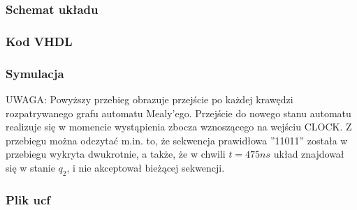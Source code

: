\documentclass[a4paper,12pt]{extarticle}  %
\begin{document}
    \subsubsection{Schemat układu}
    \begin{figure}[H]
        \centering
    \end{figure}
    \newpage
    \subsubsection{Kod VHDL}
    
    \subsubsection{Symulacja}
    \begin{figure}[H]
        \centering
    \end{figure}
    UWAGA: Powyższy przebieg obrazuje przejście po każdej krawędzi rozpatrywanego grafu automatu Mealy'ego. Przejście do nowego stanu automatu realizuje się w momencie wystąpienia zbocza wznoszącego na wejściu CLOCK. Z przebiegu można odczytać m.in. to, że sekwencja prawidłowa ''11011'' została w przebiegu wykryta dwukrotnie, a także, że w chwili $t = 475 ns$ układ znajdował się w stanie $q_2$, i nie akceptował bieżącej sekwencji.
    \subsubsection{Plik ucf}
    
\end{document}
